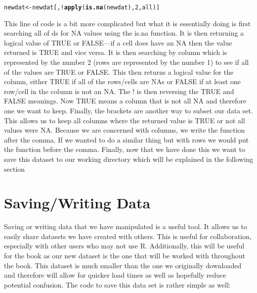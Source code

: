 \documentclass[11pt,openany]{book}\usepackage[]{graphicx}\usepackage[]{color}
\makeatletter
\newcommand{\hlnum}[1]{\textcolor[rgb]{0.686,0.059,0.569}{#1}}%
\newcommand{\hlopt}[1]{\textcolor[rgb]{0,0,0}{#1}}%
\newcommand{\hlstd}[1]{\textcolor[rgb]{0.345,0.345,0.345}{#1}}%
\newcommand{\hlkwb}[1]{\textcolor[rgb]{0.69,0.353,0.396}{#1}}%
\newcommand{\hlkwd}[1]{\textcolor[rgb]{0.737,0.353,0.396}{\textbf{#1}}}%
\newenvironment{kframe}{%
 \def\at@end@of@kframe{}%
 \ifinner\ifhmode%
  \def\at@end@of@kframe{\end{minipage}}%
  \begin{minipage}{\columnwidth}%
 \fi\fi%
 \def\FrameCommand##1{\hskip\@totalleftmargin \hskip-\fboxsep
 \colorbox{shadecolor}{##1}\hskip-\fboxsep
     \hskip-\linewidth \hskip-\@totalleftmargin \hskip\columnwidth}%
 \MakeFramed {\advance\hsize-\width
   \@totalleftmargin\z@ \linewidth\hsize
   \@setminipage}}%
 {\par\unskip\endMakeFramed%
 \at@end@of@kframe}
\newenvironment{knitrout}{}{} %
\renewenvironment{knitrout}{\begin{singlespace}}{\end{singlespace}} %
\makeatother
\begin{document}
\begin{knitrout}
\color{fgcolor}\begin{kframe}
\begin{alltt}
\hlstd{newdat} \hlkwb{<-} \hlstd{newdat[,} \hlopt{!}\hlkwd{apply}\hlstd{(}\hlkwd{is.na}\hlstd{(newdat),} \hlnum{2}\hlstd{, all)]}
\end{alltt}
\end{kframe}
\end{knitrout}

This line of code is a bit more complicated but what it is essentially doing is first searching all of ds for NA values using the is.na function. It is then returning a logical value of TRUE or FALSE---if a cell does have an NA then the value returned is TRUE and vice versa. It is then searching by column which is represented by the number 2 (rows are represented by the number 1) to see if all of the values are TRUE or FALSE. This then returns a logical value for the column, either TRUE if all of the rows/cells are NAs or FALSE if at least one row/cell in the column is not an NA. The ! is then reversing the TRUE and FALSE meanings. Now TRUE means a column that is not all NA and therefore one we want to keep. Finally, the brackets are another way to subset our data set. This allows us to keep all columns where the returned value is TRUE or not all values were NA. Because we are concerned with columns, we write the function after the comma. If we wanted to do a similar thing but with rows we would put the function before the comma. Finally, now that we have done this we want to save this dataset to our working directory which will be explained in the following section

\section{Saving/Writing Data}

Saving or writing data that we have manipulated is a useful tool. It allows us to easily share datasets we have created with others. This is useful for collaboration, especially with other users who may not use R. Additionally, this will be useful for the book as our new dataset is the one that will be worked with throughout the book. This dataset is much smaller than the one we originally downloaded and therefore will allow for quicker load times as well as hopefully reduce potential confusion. The code to save this data set is rather simple as well:
\end{document}

